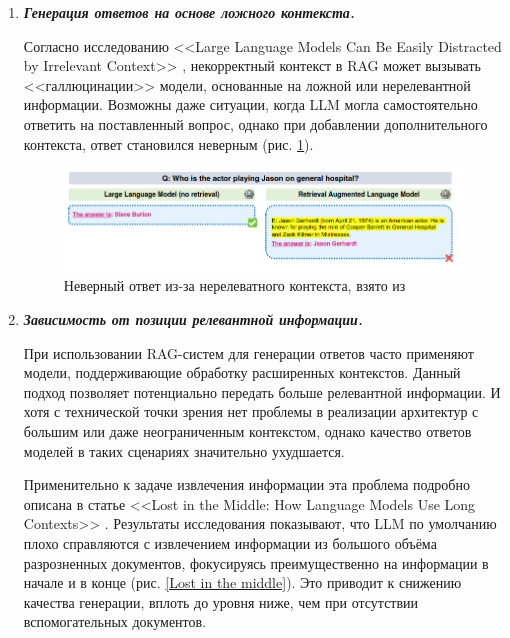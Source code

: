 \begin{enumerate}

  \item \textbf{\textit{Генерация ответов на основе ложного контекста.}}
  
    Согласно исследованию <<Large Language Models Can Be Easily Distracted by Irrelevant Context>> \cite{irrelevant_retrieve}, некорректный контекст в RAG может вызывать <<галлюцинации>> модели, основанные на ложной или нерелевантной информации. Возможны даже ситуации, когда LLM могла самостоятельно ответить на поставленный вопрос, однако при добавлении дополнительного контекста, ответ становился неверным (рис. \ref{Hallucinations}).

    \begin{figure}[h!]
        \centering
        \includegraphics[scale=0.5]{images/hallucinations.png}
        \caption{Неверный ответ из-за нерелеватного контекста, взято из \cite{irrelevant_retrieve_ralm}}
        \label{Hallucinations}
    \end{figure}

  \item \textbf{\textit{Зависимость от позиции релевантной информации.}}

    При использовании RAG-систем для генерации ответов часто применяют модели, поддерживающие обработку расширенных контекстов. Данный подход позволяет потенциально передать больше релевантной информации. И хотя с технической точки зрения нет проблемы в реализации архитектур с большим или даже неограниченным контекстом, однако качество ответов моделей в таких сценариях значительно ухудшается. 

    Применительно к задаче извлечения информации эта проблема подробно описана в статье <<Lost in the Middle: How Language Models Use Long Contexts>> \cite{lost_in_the_middle}. Результаты исследования показывают, что LLM по умолчанию плохо справляются с извлечением информации из большого объёма разрозненных документов, фокусируясь преимущественно на информации в начале и в конце (рис. \ref{Lost in the middle}). Это приводит к снижению качества генерации, вплоть до уровня ниже, чем при отсутствии вспомогательных документов.


\end{enumerate}
